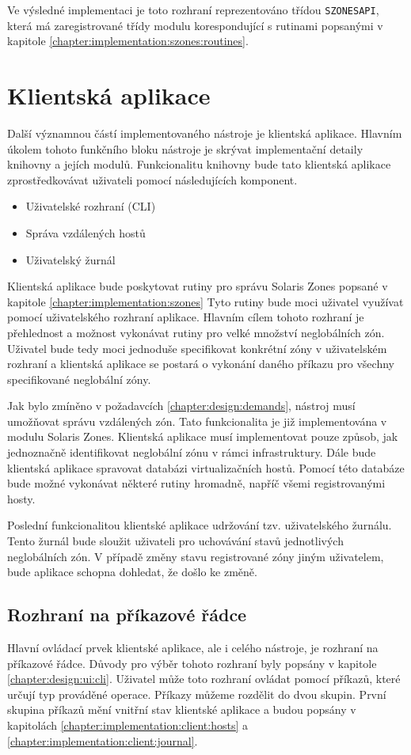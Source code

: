 Ve výsledné implementaci je toto rozhraní reprezentováno třídou \verb|SZONESAPI|, která má zaregistrované třídy modulu korespondující
s rutinami popsanými v kapitole \ref{chapter:implementation:szones:routines}.
\section{Klientská aplikace}
\label{chapter:implementation:client}
Další významnou částí implementovaného nástroje je klientská aplikace. Hlavním úkolem tohoto funkčního bloku nástroje je 
skrývat implementační detaily knihovny a jejích modulů. Funkcionalitu knihovny bude tato klientská aplikace zprostředkovávat
uživateli pomocí následujících komponent.
\begin{itemize}
 \item Uživatelské rozhraní (CLI)
 \item Správa vzdálených hostů
 \item Uživatelský žurnál
\end{itemize}
Klientská aplikace bude poskytovat rutiny pro správu Solaris Zones popsané v kapitole \ref{chapter:implementation:szones}
Tyto rutiny bude moci uživatel využívat pomocí uživatelského rozhraní aplikace. Hlavním cílem tohoto
rozhraní je přehlednost a možnost vykonávat rutiny pro velké množství neglobálních zón. Uživatel bude tedy moci jednoduše
specifikovat konkrétní zóny v uživatelském rozhraní a klientská aplikace se postará o vykonání daného příkazu pro všechny
specifikované neglobální zóny.

Jak bylo zmíněno v požadavcích \ref{chapter:design:demands}, nástroj musí umožňovat správu vzdálených zón. Tato funkcionalita
je již implementována v modulu Solaris Zones. Klientská aplikace musí implementovat pouze způsob, jak jednoznačně identifikovat
neglobální zónu v rámci infrastruktury. Dále bude klientská aplikace spravovat databázi virtualizačních hostů. Pomocí této databáze
bude možné vykonávat některé rutiny hromadně, napříč všemi registrovanými hosty.

Poslední funkcionalitou klientské aplikace udržování tzv. uživatelského žurnálu. Tento žurnál bude sloužit uživateli pro uchovávání
stavů jednotlivých neglobálních zón. V případě změny stavu registrované zóny jiným uživatelem, bude aplikace schopna dohledat,
že došlo  ke změně.
\subsection{Rozhraní na příkazové řádce}
\label{chapter:implementation:client:cli}
Hlavní ovládací prvek klientské aplikace, ale i celého nástroje, je rozhraní na příkazové řádce. Důvody pro výběr tohoto rozhraní
byly popsány v kapitole \ref{chapter:design:ui:cli}. Uživatel může toto rozhraní ovládat pomocí příkazů, které určují typ 
prováděné operace. Příkazy můžeme rozdělit do dvou skupin. První skupina příkazů mění vnitřní stav klientské aplikace a budou
popsány v kapitolách \ref{chapter:implementation:client:hosts} a \ref{chapter:implementation:client:journal}.

